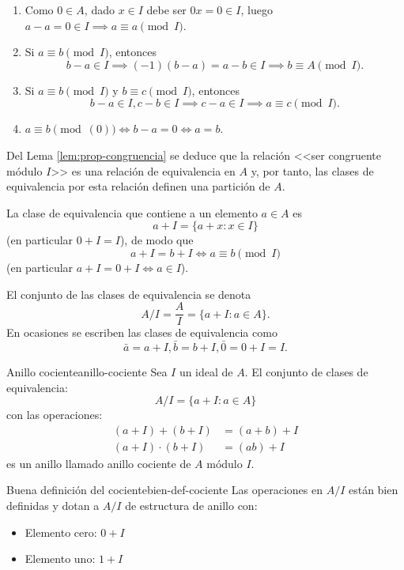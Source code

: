 \begin{proofbox}
    \begin{enumerate}
        \item Como $0 \in A$, dado $x \in I$ debe ser $0x = 0 \in I$, luego \(a - a = 0 \in I \implies a \equiv a \pmod{I}\).
        \item Si \(a \equiv b \pmod{I}\), entonces
        \[
        b - a \in I \implies (-1)(b-a) = a - b \in I \implies b \equiv A \pmod{I}.
        \]
        \item Si \(a \equiv b \pmod{I}\) y \(b \equiv c \pmod{I}\), entonces
        \[
        b - a \in I, c - b \in I \implies c - a \in I \implies a \equiv c \pmod{I}.
        \]
        \item \(a \equiv b \pmod{(0)} \iff b - a = 0 \iff a = b\).
    \end{enumerate}
\end{proofbox}

Del Lema \ref{lem:prop-congruencia} se deduce que la relación <<ser congruente módulo $I$>> es una relación de equivalencia en $A$ y, por tanto, las clases de equivalencia por esta relación definen una partición de $A$. 

La clase de equivalencia que contiene a un elemento $a \in A$ es
\[
a + I = \{a + x : x \in I\}
\]
(en particular $0 + I = I$), de modo que
\[
a + I = b + I \Leftrightarrow a \equiv b \pmod{I}
\]
(en particular $a + I = 0 + I \Leftrightarrow a \in I$). 

El conjunto de las clases de equivalencia se denota
\[
A/I = \frac{A}{I} = \{a + I : a \in A\}.
\]
En ocasiones se escriben las clases de equivalencia como
\[
\bar{a} = a + I, \bar{b} = b + I, \bar{0} = 0 + I = I.
\]

\begin{definition}{Anillo cociente}{anillo-cociente}
    Sea \(I\) un ideal de \(A\). El conjunto de clases de equivalencia:
    \[
    A/I = \{a + I : a \in A\}
    \]
    con las operaciones:
    \begin{align*}
        (a + I) + (b + I) &= (a + b) + I \\
        (a + I) \cdot (b + I) &= (ab) + I
    \end{align*}
    es un anillo llamado {anillo cociente de \(A\) módulo \(I\)}.
\end{definition}

\begin{proposition}{Buena definición del cociente}{bien-def-cociente}
    Las operaciones en \(A/I\) están bien definidas y dotan a \(A/I\) de estructura de anillo con:
    \begin{itemize}
        \item Elemento cero: \(0 + I\)
        \item Elemento uno: \(1 + I\)
    \end{itemize}
\end{proposition}

